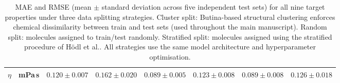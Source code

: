 \documentclass[11pt]{aime}
\begin{document}
\begin{table}[ht]
{\begin{tabular}{llcccccc}
$\eta$
  & mPa\,s
  & $0.120 \pm 0.007$ & $0.162 \pm 0.020$
  & $0.089 \pm 0.005$ & $0.123 \pm 0.008$
  & $0.089 \pm 0.008$ & $0.126 \pm 0.018$ \\
\bottomrule
\end{tabular}%
}
\caption{MAE and RMSE (mean $\pm$ standard deviation across five independent test sets) for all nine target properties under three data splitting strategies. Cluster split: Butina-based structural clustering enforces chemical dissimilarity between train and test sets (used throughout the main manuscript). Random split: molecules assigned to train/test randomly. Stratified split: molecules assigned using the stratified procedure of Hödl et al.\cite{hodl_surfpro_2025}. All strategies use the same model architecture and hyperparameter optimisation.}
\label{tab:split_comparison}
\end{table}
\end{document}
